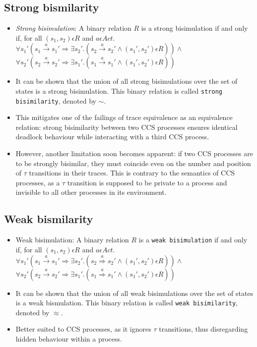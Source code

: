 \documentclass{article}
\begin{document}
\subsection{Strong bismilarity}
  \begin{itemize}
  \item \emph{Strong bisimulation}: A binary relation $R$ is a strong
    bisimulation if and only if, for all $(s_1, s_2) \epsilon R$ and $a \epsilon Act .$\\
    $\forall s_1' (s_1 \xrightarrow{a} s_1' \Rightarrow \exists s_2'
    . (s_2 \xrightarrow{a} s_2' \wedge (s_1', s_2') \epsilon R ) )
    \wedge $ \\
    $\forall s_2' (s_2 \xrightarrow{a} s_2' \Rightarrow \exists s_1'
    . (s_1 \xrightarrow{a} s_1' \wedge (s_1', s_2') \epsilon R ) )$
  \item It can be shown that the union of all strong bisimulations
    over the set of states is a strong bisimulation. This binary
    relation is called \texttt{strong bisimilarity}, denoted by $\sim$.
  \item This mitigates one of the failings of trace equivalence as an
    equivalence relation: strong bisimilarity between two CCS
    processes ensures identical deadlock behaviour while interacting
    with a third CCS process.
  \item However, another limitation soon becomes apparent: if two CCS
    processes are to be strongly bisimilar, they must coincide even on
    the number and position of $\tau$ transitions in their
    traces. This is contrary to the semantics of CCS processes, as
    a $\tau$ transition is supposed to be private to a process and
    invisible to all other processes in its environment.

  \end{itemize}

\subsection{Weak bismilarity}

  \begin{itemize}
  \item Weak bisimulation: A binary relation $R$ is a \texttt{weak
    bisimulation} if and only if, for all $(s_1, s_2) \epsilon R$ and $a \epsilon Act .$\\
    $\forall s_1' (s_1 \xrightarrow{a} s_1' \Rightarrow \exists s_2'
    . (s_2 \overset{a}{\Rightarrow} s_2' \wedge (s_1', s_2') \epsilon R ) )
    \wedge $ \\
    $\forall s_2' (s_2 \xrightarrow{a} s_2' \Rightarrow \exists s_1'
    . (s_1 \overset{a}{\Rightarrow} s_1' \wedge (s_1', s_2') \epsilon R ) )$
  \item It can be shown that the union of all weak bisimulations
    over the set of states is a weak bismulation. This binary
    relation is called \texttt{weak bisimilarity}, denoted by $\approx$.
  \item Better suited to CCS processes,
    as it ignores $\tau$ transitions, thus disregarding hidden
    behaviour within a process.
  \end{itemize}
\end{document}
